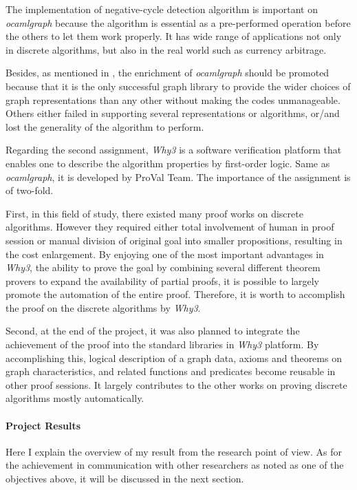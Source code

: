 \documentclass[a4paper,10.5pt]{article}
\begin{document}
The implementation of negative-cycle detection algorithm is important
on \emph{ocamlgraph} because the algorithm is essential as a
pre-performed operation before the others to let them work properly.
It has wide range of applications not only in discrete algorithms, but
also in the real world such as currency arbitrage.

Besides, as mentioned in \cite{conchon07tfp}, the enrichment of
\emph{ocamlgraph} should be promoted because that it is the only
successful graph library to provide the wider choices of graph
representations than any other without making the codes unmanageable.
Others either failed in supporting several representations or
algorithms, or/and lost the generality of the algorithm to perform.

Regarding the second assignment, \emph{Why3} \cite{boogie11why3} is a
software verification platform that enables one to describe the
algorithm properties by first-order logic. Same as \emph{ocamlgraph},
it is developed by ProVal Team. The importance of the assignment is of
two-fold.

First, in this field of study, there existed many proof works on
discrete algorithms. However they required either total involvement of
human in proof session or manual division of original goal into
smaller propositions, resulting in the cost enlargement. By enjoying
one of the most important advantages in \emph{Why3}, the ability to
prove the goal by combining several different theorem provers to
expand the availability of partial proofs, it is possible to largely
promote the automation of the entire proof. Therefore, it is worth to
accomplish the proof on the discrete algorithms by \emph{Why3}.

Second, at the end of the project, it was also planned to integrate
the achievement of the proof into the standard libraries in
\emph{Why3} platform. By accomplishing this, logical description of a
graph data, axioms and theorems on graph characteristics, and related
functions and predicates become reusable in other proof sessions. It
largely contributes to the other works on proving discrete algorithms
mostly automatically.

\paragraph{Project Results}

Here I explain the overview of my result from the research point of
view. As for the achievement in communication with other researchers
as noted as one of the objectives above, it will be discussed in the
next section.
\end{document}
